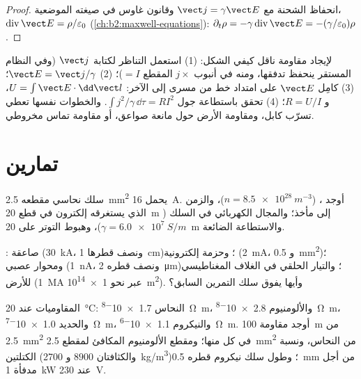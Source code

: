 \begin{proof}
انحفاظ الشحنة مع $\vect j = \gamma\vect E$ وقانون غاوس في صيغته
الموضعية، $\operatorname{div}\vect E = \rho/\varepsilon_0$ (\cref{ch:b2:maxwell-equations}):
$\partial_t\rho = -\gamma\operatorname{div}\vect E = -(\gamma/\varepsilon_0)\rho$.
\end{proof}

\begin{method}\label{met:b2:charges-currents-conduction:method}
لإيجاد مقاومة ناقل كيفي الشكل: (1) استعمل التناظر لكتابة
$\vect j$ (وفي النظام المستقر ينحفظ تدفقها، ومنه في
أنبوب $j \times$ المقطع $= I$)؛ (2) $\vect E = \vect j/\gamma$؛ (3) كامِل
$\vect E$ على امتداد خط من مسرى إلى الآخر: $U = \int\vect E\cdot
\dd\vect l$، و $R = U/I$؛ (4) تحقق باستطاعة جول $\int j^2/\gamma\,
\dd\tau = RI^2$. والخطوات نفسها تعطي تسرّب كابل، ومقاومة
الأرض حول مانعة صواعق، أو مقاومة تماس مخروطي.
\end{method}

\section{تمارين}

\begin{exercise}[$\star$]\label{exo:b2:charges-currents-conduction:1}
سلك نحاسي مقطعه \qty{2.5}{mm^2} يحمل \qty{16}{A}. أوجد ،  ($n = \qty{8.5e28}{m^{-3}}$)، والزمن الذي يستغرقه إلكترون في قطع
\qty{20}{m} إلى مأخذ؛ والمجال الكهربائي في السلك ($\gamma = \qty{6.0e7}{S/m}$)،
وهبوط التوتر على \qty{20}{m} والاستطاعة الضائعة.
\end{exercise}

\begin{exercise}[$\star$]\label{exo:b2:charges-currents-conduction:2}
: صاعقة (\qty{30}{kA}، ونصف قطرها \qty{1}{cm})؛ وحزمة
إلكترونية (\qty{2}{mA}، و \qty{0.5}{mm^2})؛ ومحوار عصبي (\qty{1}{nA}، ونصف قطره
\qty{2}{\micro m})؛ والتيار الحلقي في الغلاف المغناطيسي للأرض (\qty{1}{MA} عبر
نحو \qty{1e14}{m^2}). وأيها يفوق سلك التمرين السابق؟
\end{exercise}

\begin{exercise}[$\star$]\label{exo:b2:charges-currents-conduction:3}
المقاوميات عند \qty{20}{\degreeCelsius}: النحاس \qty{1.7e-8}{\ohm.m}، والألومنيوم
\qty{2.8e-8}{\ohm.m}، والحديد \qty{1.0e-7}{\ohm.m}، والنيكروم \qty{1.1e-6}{\ohm.m}.
أوجد مقاومة \qty{100}{m} من \qty{2.5}{mm^2} في كل منها؛ ومقطع الألومنيوم
المكافئ لمقطع \qty{2.5}{mm^2} من النحاس، ونسبة الكتلتين (والكثافتان
$8900$ و \qty{2700}{kg/m^3})؛ وطول سلك نيكروم قطره \qty{0.5}{mm} من أجل
مدفأة \qty{1}{kW} عند \qty{230}{V}.
\end{exercise}

